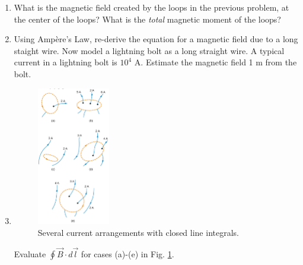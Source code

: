 \documentclass[10pt]{article}
\begin{document}
\begin{enumerate}
\begin{enumerate}
\item What is the magnetic field created by the loops in the previous problem, at the center of the loops?  What is the \textit{total} magnetic moment of the loops? \\ \vspace{1cm}
\item Using Amp\`{e}re's Law, re-derive the equation for a magnetic field due to a long staight wire.  Now model a lightning bolt as a long straight wire.  A typical current in a lightning bolt is $10^4$ A. Estimate the magnetic field 1 m from the bolt. \\ \vspace{1 cm}
\item
\begin{figure}
\centering
\includegraphics[width=0.3\textwidth,trim=0cm 0cm 0cm 0.25cm,clip=true]{amplaw.png}
\caption{\label{fig:amplaw} Several current arrangements with closed line integrals.}
\end{figure}
Evaluate $\oint \vec{B} \cdot d\vec{l}$ for cases (a)-(e) in Fig. \ref{fig:amplaw}.
\end{enumerate}
\end{enumerate}
\end{document}
